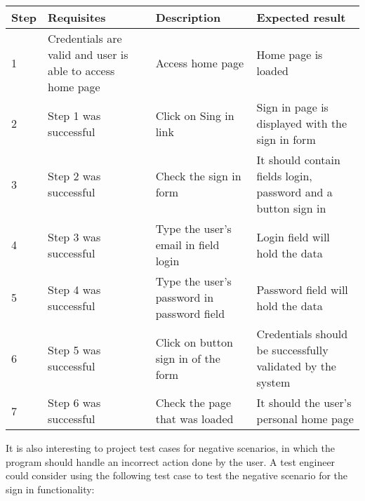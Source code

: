 \begin{center}

\begin{tabular}{| l | p{3cm} | p{5cm} | p{5cm} |}
\hline

Step & Requisites & Description & Expected result \\ \hline

1 & Credentials are valid and user is able to access home page & Access home page & Home page is loaded\\ \hline

2 & Step 1 was successful & Click on Sing in link & Sign in page is displayed with the sign in form \\ \hline

3 & Step 2 was successful & Check the sign in form & It should contain fields login, password and a button sign in \\ \hline

4 & Step 3 was successful & Type the user's email in field login & Login field will hold the data\\ \hline

5 & Step 4 was successful & Type the user's password in password field & Password field will hold the data \\ \hline

6 & Step 5 was successful & Click on button sign in of the form & Credentials should be successfully validated by the system \\ \hline

7 & Step 6 was successful & Check the page that was loaded & It should the user's personal home page\\

\hline
\end{tabular}

\end{center}

It is also interesting to project test cases for negative scenarios, in which the program should handle an incorrect action done by the user. A test engineer could consider using the following test case to test the negative scenario for the sign in functionality:

